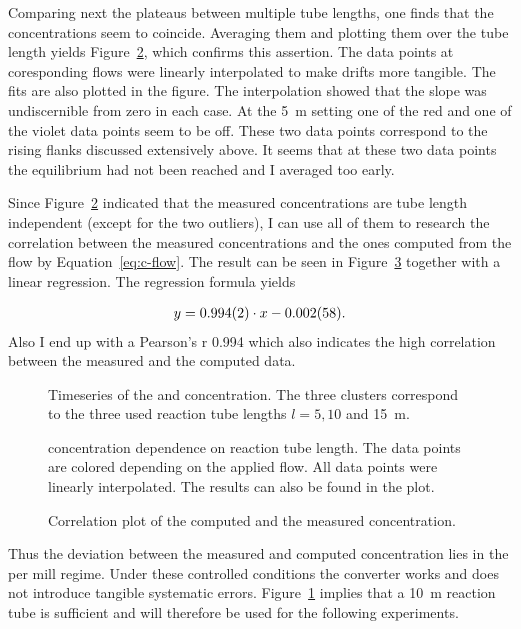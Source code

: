 Comparing next the  plateaus between multiple tube lengths, one
finds that the concentrations seem to coincide. Averaging them and
plotting them over the tube length yields Figure~\ref{fig:no-length},
which confirms this assertion. The data points at coresponding flows
were linearly interpolated to make drifts more tangible. The fits are
also plotted in the figure. The interpolation showed that the slope
was undiscernible from zero in each case. At the \SI{5}{\meter}
setting one of the red and one of the violet data points seem to be
off. These two data points correspond to the rising flanks discussed
extensively above. It seems that at these two data points the
equilibrium had not been reached and I averaged too early.

Since Figure~\ref{fig:no-length} indicated that the measured
concentrations are tube length independent (except for the two
outliers), I can use all of them to research the correlation between
the measured concentrations and the ones computed from the flow by
Equation~\eqref{eq:c-flow}. The result can be seen in
Figure~\ref{fig:no-calib} together with a linear regression. The
regression formula yields

\begin{align*}
  y = \num{0.994 \pm 0.002}  \cdot x -\num{0.002 \pm 0.058}.
\end{align*}
Also I end up with a Pearson's r 0.994 which also indicates the high
correlation between the measured and the computed data.
\begin{figure}[htbp]
  \centering
  
  \hfill
  
  \caption{Timeseries of the  and  concentration. The
    three clusters correspond to the three used reaction tube lengths
    $l = 5, 10$ and \SI{15}{\meter}.}
  \label{fig:ts}
\end{figure}
\begin{figure}[htbp]
  \centering
  
  \caption{ concentration dependence on reaction tube
    length. The data points are colored depending on the applied
     flow. All data points were linearly interpolated. The
    results can also be found in the plot.}
  \label{fig:no-length}
\end{figure}

\begin{figure}[htbp]
  \centering
  
  \caption{Correlation plot of the computed and the measured 
    concentration.}
  \label{fig:no-calib}
\end{figure}

Thus the deviation between the measured and computed
concentration lies in the per mill regime. Under these
controlled conditions the converter works and does not introduce
tangible systematic errors. Figure~\ref{fig:ts} implies that a
\SI{10}{\meter} reaction tube is sufficient and will therefore be used
for the following experiments.

